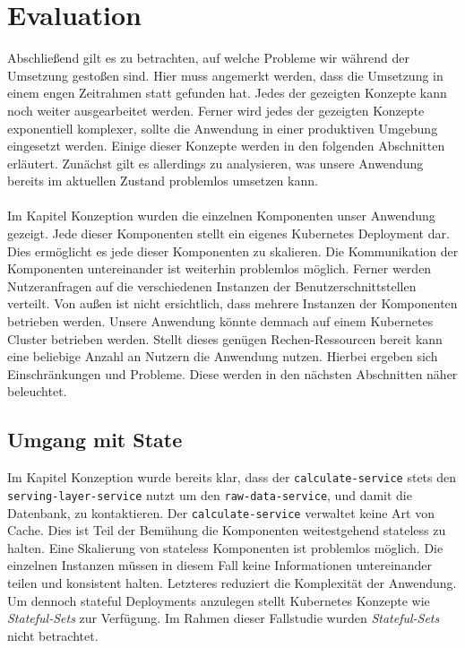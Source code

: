 \section{Evaluation}
Abschließend gilt es zu betrachten, auf welche Probleme wir während der Umsetzung gestoßen sind. Hier muss angemerkt werden, dass die Umsetzung in einem engen Zeitrahmen statt gefunden hat. Jedes der gezeigten Konzepte kann noch weiter ausgearbeitet werden. Ferner wird jedes der gezeigten Konzepte exponentiell komplexer, sollte die Anwendung in einer produktiven Umgebung eingesetzt werden. Einige dieser Konzepte werden in den folgenden Abschnitten erläutert. Zunächst gilt es allerdings zu analysieren, was unsere Anwendung bereits im aktuellen Zustand problemlos umsetzen kann.\\
\\
Im Kapitel Konzeption wurden die einzelnen Komponenten unser Anwendung gezeigt. Jede dieser Komponenten stellt ein eigenes Kubernetes Deployment dar. Dies ermöglicht es jede dieser Komponenten zu skalieren. Die Kommunikation der Komponenten untereinander ist weiterhin problemlos möglich. Ferner werden Nutzeranfragen auf die verschiedenen Instanzen der Benutzerschnittstellen verteilt. Von außen ist nicht ersichtlich, dass mehrere Instanzen der Komponenten betrieben werden. Unsere Anwendung könnte demnach auf einem Kubernetes Cluster betrieben werden. Stellt dieses genügen Rechen-Ressourcen bereit kann eine beliebige Anzahl an Nutzern die Anwendung nutzen. Hierbei ergeben sich Einschränkungen und Probleme. Diese werden in den nächsten Abschnitten näher beleuchtet.
\subsection{Umgang mit State}
Im Kapitel Konzeption wurde bereits klar, dass der \lstinline{calculate-service} stets den \lstinline{serving-layer-service} nutzt um den \lstinline{raw-data-service}, und damit die Datenbank, zu kontaktieren. Der \lstinline{calculate-service} verwaltet keine Art von Cache. Dies ist Teil der Bemühung die Komponenten weitestgehend stateless zu halten. Eine Skalierung von stateless Komponenten ist problemlos möglich. Die einzelnen Instanzen müssen in diesem Fall keine Informationen untereinander teilen und  konsistent halten. Letzteres reduziert die Komplexität der Anwendung. Um dennoch stateful Deployments anzulegen stellt Kubernetes Konzepte wie \textit{Stateful-Sets} \cite{noauthor_statefulsets_nodate} zur Verfügung. Im Rahmen dieser Fallstudie wurden\textit{ Stateful-Sets} nicht betrachtet. 
